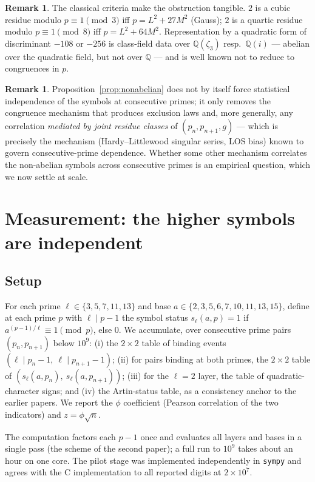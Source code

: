 \documentclass[11pt,reqno]{amsart}
\theoremstyle{plain}
\theoremstyle{definition}
\newtheorem{remark}[theorem]{Remark}
\newcommand{\Q}{\mathbb{Q}}
\begin{document}
\begin{remark}
The classical criteria make the obstruction tangible. $2$ is a cubic residue
modulo $p \equiv 1 \pmod 3$ iff $p = L^2 + 27M^2$ (Gauss); $2$ is a quartic
residue modulo $p \equiv 1 \pmod 8$ iff $p = L^2 + 64M^2$. Representation by
a quadratic form of discriminant $-108$ or $-256$ is class-field data over
$\Q(\zeta_3)$ resp.\ $\Q(i)$ --- abelian over the quadratic field, but not
over $\Q$ --- and is well known not to reduce to congruences in $p$.
\end{remark}

\begin{remark}
Proposition~\ref{prop:nonabelian} does not by itself force statistical
independence of the symbols at consecutive primes; it only removes the
congruence mechanism that produces exclusion laws and, more generally, any
correlation \emph{mediated by joint residue classes} of
$(p_n, p_{n+1}, g)$ --- which is precisely the mechanism (Hardy--Littlewood
singular series, LOS bias) known to govern consecutive-prime dependence.
Whether some other mechanism correlates the non-abelian symbols across
consecutive primes is an empirical question, which we now settle at scale.
\end{remark}

\section{Measurement: the higher symbols are independent}
\label{sec:measurement}

\subsection{Setup}
For each prime $\ell \in \{3,5,7,11,13\}$ and base
$a \in \{2,3,5,6,7,10,11,13,15\}$, define at each prime $p$ with
$\ell \mid p - 1$ the symbol status
$s_\ell(a, p) = 1$ if $a^{(p-1)/\ell} \equiv 1 \pmod p$, else $0$. We
accumulate, over consecutive prime pairs $(p_n, p_{n+1})$ below $10^9$:
(i) the $2\times2$ table of binding events
$(\ell \mid p_n - 1,\ \ell \mid p_{n+1} - 1)$;
(ii) for pairs binding at both primes, the $2\times2$ table of
$(s_\ell(a, p_n),\ s_\ell(a, p_{n+1}))$;
(iii) for the $\ell = 2$ layer, the table of quadratic-character signs; and
(iv) the Artin-status table, as a consistency anchor to the earlier papers.
We report the $\phi$ coefficient (Pearson correlation of the two indicators)
and $z = \phi\sqrt{n}$.

The computation factors each $p - 1$ once and evaluates all layers and bases
in a single pass (the scheme of the second paper); a full run to $10^9$
takes about an hour on one core. The pilot stage was implemented
independently in \texttt{sympy} and agrees with the C implementation to all
reported digits at $2\times10^7$.
\end{document}
